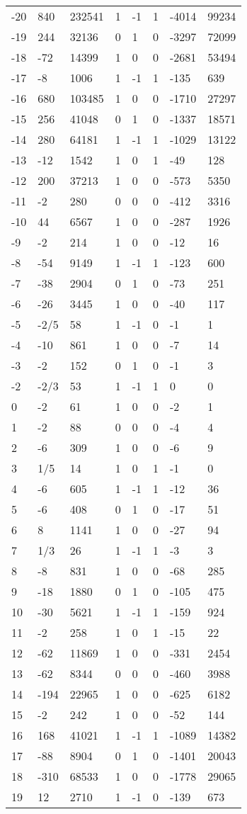 \documentclass{amsart}
\begin{document}
\begin{longtable}{|l|l|l|lllll|}
-20&840&232541&1&-1&1&-4014&99234\\
-19&244&32136&0&1&0&-3297&72099\\
-18&-72&14399&1&0&0&-2681&53494\\
-17&-8&1006&1&-1&1&-135&639\\
-16&680&103485&1&0&0&-1710&27297\\
-15&256&41048&0&1&0&-1337&18571\\
-14&280&64181&1&-1&1&-1029&13122\\
-13&-12&1542&1&0&1&-49&128\\
-12&200&37213&1&0&0&-573&5350\\
-11&-2&280&0&0&0&-412&3316\\
-10&44&6567&1&0&0&-287&1926\\
-9&-2&214&1&0&0&-12&16\\
-8&-54&9149&1&-1&1&-123&600\\
-7&-38&2904&0&1&0&-73&251\\
-6&-26&3445&1&0&0&-40&117\\
-5&-2/5&58&1&-1&0&-1&1\\
-4&-10&861&1&0&0&-7&14\\
-3&-2&152&0&1&0&-1&3\\
-2&-2/3&53&1&-1&1&0&0\\
0&-2&61&1&0&0&-2&1\\
1&-2&88&0&0&0&-4&4\\
2&-6&309&1&0&0&-6&9\\
3&1/5&14&1&0&1&-1&0\\
4&-6&605&1&-1&1&-12&36\\
5&-6&408&0&1&0&-17&51\\
6&8&1141&1&0&0&-27&94\\
7&1/3&26&1&-1&1&-3&3\\
8&-8&831&1&0&0&-68&285\\
9&-18&1880&0&1&0&-105&475\\
10&-30&5621&1&-1&1&-159&924\\
11&-2&258&1&0&1&-15&22\\
12&-62&11869&1&0&0&-331&2454\\
13&-62&8344&0&0&0&-460&3988\\
14&-194&22965&1&0&0&-625&6182\\
15&-2&242&1&0&0&-52&144\\
16&168&41021&1&-1&1&-1089&14382\\
17&-88&8904&0&1&0&-1401&20043\\
18&-310&68533&1&0&0&-1778&29065\\
19&12&2710&1&-1&0&-139&673\\

\end{longtable}
\end{document}
